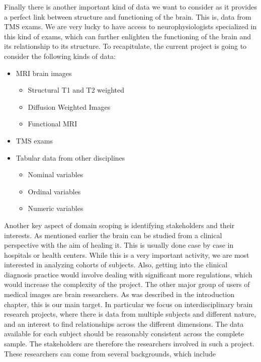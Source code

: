 Finally there is another important kind of data we want to consider as it provides a perfect link between structure and functioning of the brain. This is, data from TMS exams. We are very lucky to have access to neurophysiologists specialized in this kind of exams, which can further enlighten the functioning of the brain and its relationship to its structure. To recapitulate, the current project is going to consider the following kinds of data:

\begin{itemize}
\item MRI brain images
\begin{itemize}
\item Structural T1 and T2 weighted
\item Diffusion Weighted Images
\item Functional MRI
\end{itemize}
\item TMS exams
\item Tabular data from other disciplines
\begin{itemize}
\item Nominal variables
\item Ordinal variables
\item Numeric variables
\end{itemize}
\end{itemize}  

Another key aspect of domain scoping is identifying stakeholders and their interests. As mentioned earlier the brain can be studied from a clinical perspective with the aim of healing it. This is usually done case by case in hospitals or health centers. While this is a very important activity, we are most interested in analyzing cohorts of subjects. Also, getting into the clinical diagnosis practice would involve dealing with significant more regulations, which would increase the complexity of the project. The other major group of users of medical images are brain researchers. As was described in the introduction chapter, this is our main target. In particular we focus on interdisciplinary brain research projects, where there is data from multiple subjects and different nature, and an interest to find relationships across the different dimensions. The data available for each subject should be reasonably consistent across the complete sample. The stakeholders are therefore the researchers involved in such a project. These researchers can come from several backgrounds, which include

